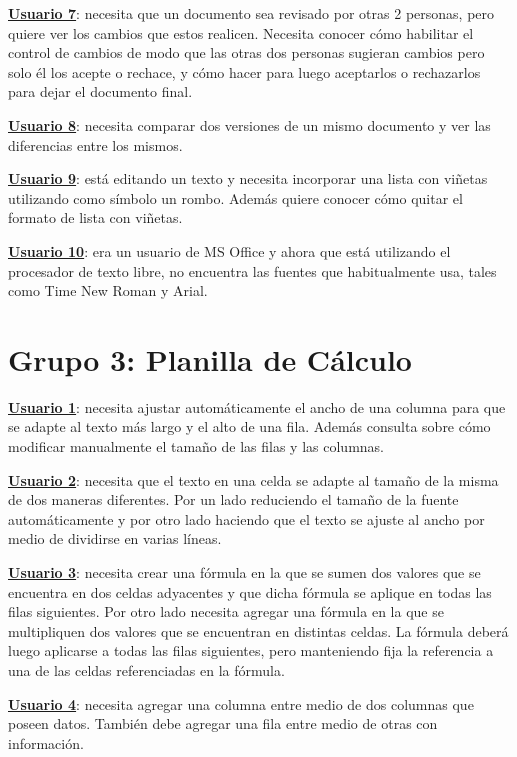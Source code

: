 \documentclass[12pt]{article}
\begin{document}
\textbf{\underline{Usuario 7}}: necesita que un documento sea revisado por otras 2 personas, pero quiere ver los cambios que estos realicen. Necesita conocer cómo habilitar el control de cambios de modo que las otras dos personas sugieran cambios pero solo él los acepte o rechace, y cómo hacer para luego  aceptarlos o rechazarlos para dejar el documento final.

\textbf{\underline{Usuario 8}}: necesita comparar dos versiones de un mismo documento y ver las diferencias entre los mismos. 

\textbf{\underline{Usuario 9}}: está editando un texto y necesita incorporar una lista con viñetas utilizando como símbolo un rombo. Además quiere conocer cómo quitar el formato de lista con viñetas.

\textbf{\underline{Usuario 10}}: era un usuario de MS Office y ahora que está utilizando el procesador de texto libre, no encuentra las fuentes que habitualmente usa, tales como Time New Roman y Arial.

\section*{\textbf{Grupo 3: Planilla de Cálculo}}

\textbf{\underline{Usuario 1}}: necesita ajustar automáticamente el ancho de una columna para que se adapte al texto más largo y el alto de una fila. Además consulta sobre cómo modificar manualmente el tamaño de las filas y las columnas.

\textbf{\underline{Usuario 2}}: necesita que el texto en una celda se adapte al tamaño de la misma de dos maneras diferentes. Por un lado reduciendo el tamaño de la fuente automáticamente y por otro lado haciendo que el texto se ajuste al ancho por medio de dividirse en varias líneas.

\textbf{\underline{Usuario 3}}: necesita crear una fórmula en la que se sumen dos valores que se encuentra en dos celdas adyacentes y que dicha fórmula se aplique en todas las filas siguientes. Por otro lado necesita agregar una fórmula en la que se multipliquen dos valores que se encuentran en distintas celdas. La fórmula deberá luego aplicarse a todas las filas siguientes, pero manteniendo fija la referencia a una de las celdas referenciadas en la fórmula.

\textbf{\underline{Usuario 4}}: necesita agregar una columna entre medio de dos columnas que poseen datos. También debe agregar una fila entre medio de otras con información.
\end{document}
